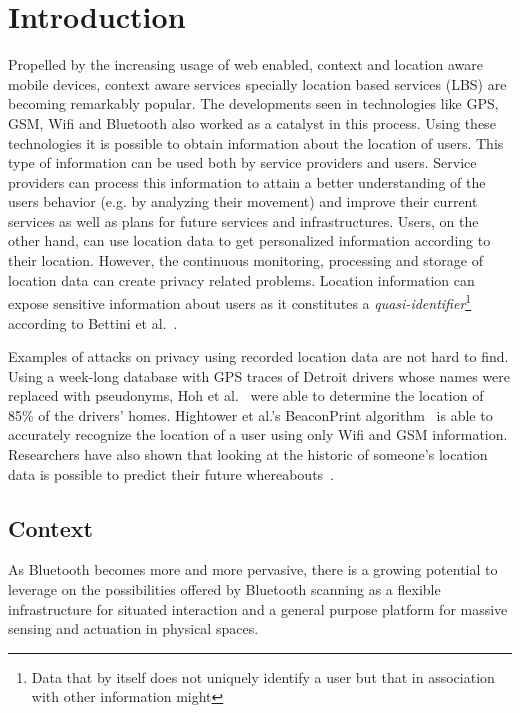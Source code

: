 \chapter{Introduction}
\label{cha:introduction}

Propelled by the increasing usage of web enabled, context and location
aware mobile devices, context aware services specially location based
services (LBS) are becoming remarkably popular. The developments seen
in technologies like GPS, GSM, Wifi and Bluetooth also worked as a
catalyst in this process. Using these technologies it is possible to
obtain information about the location of users. This type of
information can be used both by service providers and users. Service
providers can process this information to attain a better
understanding of the users behavior (e.g. by analyzing their movement)
and improve their current services as well as plans for future
services and infrastructures. Users, on the other hand, can use
location data to get personalized information according to their
location. However, the continuous monitoring, processing and storage
of location data can create privacy related problems. Location
information can expose sensitive information about users as it
constitutes a \emph{quasi-identifier}\footnote{Data that by itself
  does not uniquely identify a user but that in association with other
  information might} according to Bettini et
al.~\cite{bettini2005protecting}. 

Examples of attacks on privacy using
recorded location data are not hard to find. Using a week-long
database with GPS traces of Detroit drivers whose names were replaced
with pseudonyms, Hoh et al.~\cite{hoh2006enhancing} were able to
determine the location of 85\% of the drivers' homes. Hightower et
al.'s BeaconPrint algorithm~\cite{hightower2005learning} is able to
accurately recognize the location of a user using only Wifi and GSM
information. Researchers have also shown that looking at the historic
of someone's location data is possible to predict their future
whereabouts~\cite{krumm2006predestination,froehlich2008route}.


\section{Context}
\label{sec:context}

As Bluetooth becomes more and more pervasive, there is a growing
potential to leverage on the possibilities offered by Bluetooth
scanning as a flexible infrastructure for situated interaction and a
general purpose platform for massive sensing and actuation in physical
spaces.

